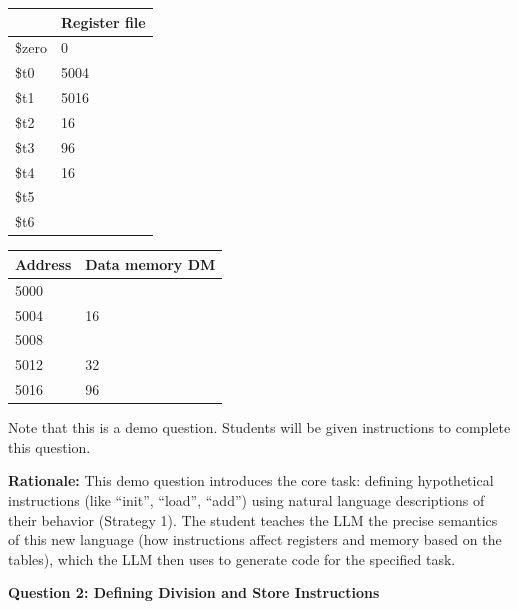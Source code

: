 \documentclass{article} %
\begin{document}
\noindent
\begin{minipage}[t]{0.49\textwidth}
  \centering
  \begin{tabular}{ll}
    \toprule
         & Register file \\ \midrule
    \$zero & 0             \\
    \$t0   & 5004          \\
    \$t1   & 5016          \\
    \$t2   & 16            \\
    \$t3   & 96            \\
    \$t4   & 16            \\
    \$t5   &               \\
    \$t6   &               \\
    \bottomrule
  \end{tabular}
  \label{tab:reg_file_q1_full}
\end{minipage}
\hfill
\begin{minipage}[t]{0.49\textwidth}
  \centering
  \begin{tabular}{ll}
    \toprule
    Address & Data memory DM \\ \midrule
    5000 &                \\
    5004 & 16             \\
    5008 &                \\
    5012 & 32             \\
    5016 & 96             \\
    \bottomrule
  \end{tabular}
  \label{tab:data_mem_q1_full}
\end{minipage}



\vspace{1em}Note that this is a demo question. Students will be given instructions to complete this question. 

\textbf{Rationale:} This demo question introduces the core task: defining hypothetical instructions (like ``init'', ``load'', ``add'') using natural language descriptions of their behavior (Strategy 1). The student teaches the LLM the precise semantics of this new language (how instructions affect registers and memory based on the tables), which the LLM then uses to generate code for the specified task.

\textbf{Question 2: Defining Division and Store Instructions}
\end{document}
